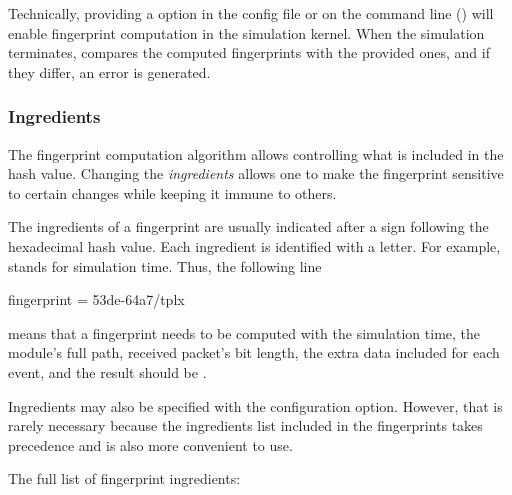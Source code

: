 Technically, providing a  option in the config file or
on the command line () will enable fingerprint
computation in the {\opp} simulation kernel. When the simulation terminates,
{\opp} compares the computed fingerprints with the provided ones, and
if they differ, an error is generated.

\subsubsection{Ingredients}
\label{sec:testing:fingerprint-ingredients}

The fingerprint computation algorithm allows controlling what is included
in the hash value. Changing the \textit{ingredients} allows one to make the
fingerprint sensitive to certain changes while keeping it immune to
others.

The ingredients of a fingerprint are usually indicated after a \ttt{/} sign
following the hexadecimal hash value. Each ingredient is identified with a
letter. For example,  stands for simulation time. Thus, the following
 line

\begin{inifile}
fingerprint = 53de-64a7/tplx
\end{inifile}

means that a fingerprint needs to be computed with the simulation time, the
module's full path, received packet's bit length, the extra data included
for each event, and the result should be .

Ingredients may also be specified with the 
configuration option. However, that is rarely necessary because the ingredients
list included in the fingerprints takes precedence and is also more convenient
to use.

The full list of fingerprint ingredients:

